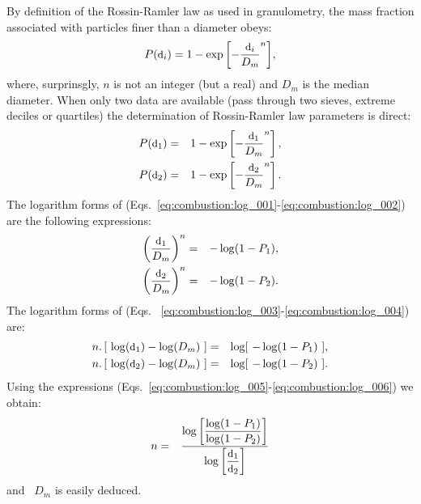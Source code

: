 By definition of the Rossin-Ramler law as used in granulometry, the mass
fraction associated with particles finer than a diameter obeys:
\begin{equation*}
  P(\mbox{\small d}_i) = 1-\exp{\left[-\dfrac{\mbox{\small d}_i}{D_m} ^n \right]},
\end{equation*}
where, surprinsgly, $n$ is not an integer (but a real) and $D_m$ is the median
diameter. When only two data are available (pass through two sieves, extreme
deciles or quartiles) the determination of Rossin-Ramler law parameters is
direct:
\begin{eqnarray}
  \displaystyle P(\mbox{\small d}_1) &=& 1-\exp\left[-\frac{\mbox{\small d}_1}{D_m}^n\right], \label{eq:combustion:log_001} \\
  \displaystyle P(\mbox{\small d}_2) &=& 1-\exp\left[-\frac{\mbox{\small d}_2}{D_m}^n\right]. \label{eq:combustion:log_002}
\end{eqnarray}
The logarithm forms of (Eqs.~\ref{eq:combustion:log_001}-\ref{eq:combustion:log_002}) are the
following expressions:
\begin{eqnarray}
  \displaystyle \left(\frac{\mbox{\small d}_1}{D_m} \right)^n &=& - \log(1-P_1), \label{eq:combustion:log_003} \\
  \displaystyle \left(\frac{\mbox{\small d}_2}{D_m} \right)^n &=& - \log(1-P_2). \label{eq:combustion:log_004}
\end{eqnarray}
The logarithm forms of (Eqs. ~\ref{eq:combustion:log_003}-\ref{eq:combustion:log_004})
are:
\begin{eqnarray}
  \displaystyle n . \left[~ \log(\mbox{\small d}_1)-\log(D_m)~\right] &=& \log[~-\log(1-P_1)~], \label{eq:combustion:log_005} \\
  \displaystyle n . \left[~ \log(\mbox{\small d}_2)-\log(D_m)~\right] &=& \log[~-\log(1-P_2)~]. \label{eq:combustion:log_006}
\end{eqnarray}
Using the expressions (Eqs.~\ref{eq:combustion:log_005}-\ref{eq:combustion:log_006}) we obtain:
\begin{eqnarray}
n &=& \frac{\log \left[\displaystyle\frac{ \log(1-P_1)}{\log(1-P_2)}\right]}{\displaystyle\log\left[\frac{\mbox{\small d}_1}{\mbox{\small d}_2} \right]}
\end{eqnarray}
and~ $D_m$ is easily deduced.

